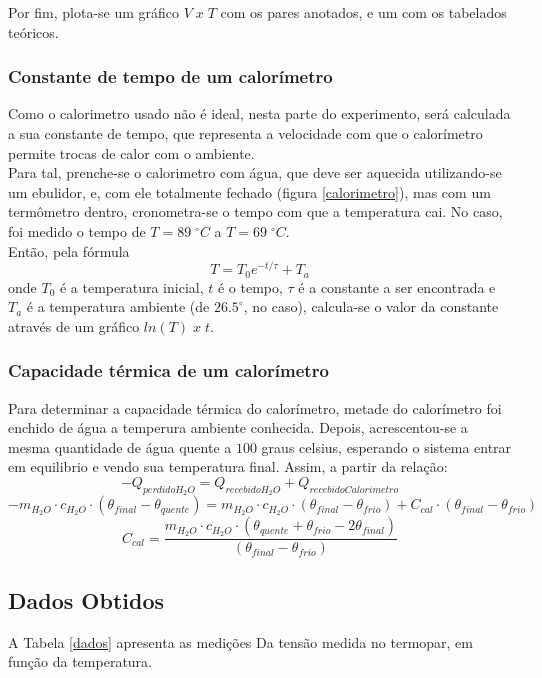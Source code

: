 \documentclass[12pt,a4paper]{article}
\begin{document}
Por fim, plota-se um gráfico $V \; x \; T$ com os pares anotados, e um com os tabelados teóricos.\\

\subsubsection{Constante de tempo de um calorímetro}

Como o calorimetro usado não é ideal, nesta parte do experimento, será calculada a sua constante de tempo, que representa a velocidade com que o calorímetro permite trocas de calor com o ambiente.\\
Para tal, prenche-se o calorimetro com água, que deve ser aquecida utilizando-se um ebulidor, e, com ele totalmente fechado (figura \ref{calorimetro}), mas com um termômetro dentro, cronometra-se o tempo com que a temperatura cai. No caso, foi medido o tempo de $T = 89 \; ^{\circ} C$ a $T = 69 \; ^{\circ} C$.\\
Então, pela fórmula 
$$T = T_0 e ^{-t/\tau} + T_a$$
onde $T_0$ é a temperatura inicial, $t$ é o tempo, $\tau$ é a constante a ser encontrada e $T_a$ é a temperatura ambiente (de $26.5 ^{\circ}$, no caso), calcula-se o valor da constante através de um gráfico $ln(T) \; x \; t$.
\subsubsection{Capacidade térmica de um calorímetro}
Para determinar a capacidade térmica do calorímetro, metade do calorímetro foi enchido de água a temperura ambiente conhecida. Depois, acrescentou-se a mesma quantidade de água quente a $100$ graus celsius, esperando o sistema entrar em equilibrio e vendo sua temperatura final. Assim, a partir da relação:
$$-Q_{perdido H_2O} = Q_{recebido H_2O} + Q_{recebido Calorimetro}$$
$$-m_{H_2O}\cdot c_{H_2O} \cdot (\theta_{final}-\theta_{quente}) = m_{H_2O}\cdot c_{H_2O} \cdot (\theta_{final}-\theta_{frio}) + C_{cal}\cdot (\theta_{final}-\theta_{frio}) $$
$$C_{cal} = \frac{m_{H_2O}\cdot c_{H_2O}\cdot(\theta_{quente} + \theta_{frio} -2\theta_{final})}{(\theta_{final}-\theta_{frio})}$$


\subsection{Dados Obtidos}

A Tabela \ref{dados} apresenta as medições Da tensão medida no termopar, em função da temperatura.
\end{document}
